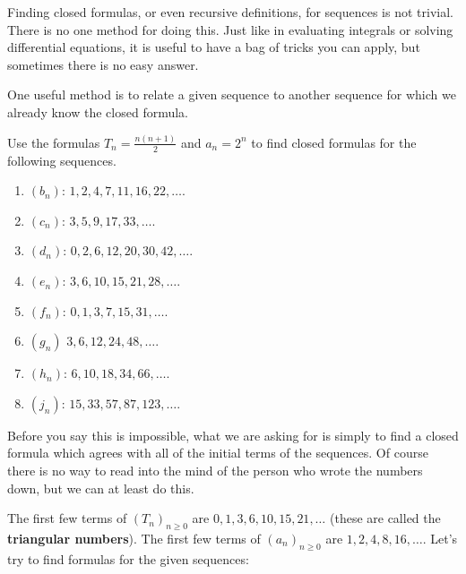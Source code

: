 \documentclass[11pt,]{book}
\newcommand{\terminology}[1]{\textbf{#1}}
\theoremstyle{ptxplainnotitle}
\theoremstyle{ptxplaintitle}
\theoremstyle{ptxdefinitionnotitle}
\theoremstyle{ptxdefinitiontitle}
\theoremstyle{ptxdefinitionnotitle}
\theoremstyle{ptxdefinitiontitle}
\theoremstyle{ptxdefinitionnotitle}
\theoremstyle{ptxdefinitiontitle}
\theoremstyle{ptxdefinitiontitlenonumber}
\theoremstyle{ptxdefinitiontitlenonumber}
\numberwithin{equation}{chapter}
\begin{document}
\hypertarget{p-58}{}%
Finding closed formulas, or even recursive definitions, for sequences is not trivial. There is no one method for doing this. Just like in evaluating integrals or solving differential equations, it is useful to have a bag of tricks you can apply, but sometimes there is no easy answer.%
\par
\hypertarget{p-59}{}%
One useful method is to relate a given sequence to another sequence for which we already know the closed formula.%
\begin{example}\label{example-4}
\hypertarget{p-60}{}%
Use the formulas \(T_n = \frac{n(n+1)}{2}\) and \(a_n = 2^n\) to find closed formulas for the following sequences. \leavevmode%
\begin{enumerate}
\item\hypertarget{li-34}{}\hypertarget{p-61}{}%
\((b_n)\): \(1, 2, 4, 7, 11, 16, 22, \ldots \).%
\item\hypertarget{li-35}{}\hypertarget{p-62}{}%
\((c_n)\): \(3, 5, 9, 17, 33,\ldots \).%
\item\hypertarget{li-36}{}\hypertarget{p-63}{}%
\((d_n)\): \(0, 2, 6, 12, 20, 30, 42,\ldots \).%
\item\hypertarget{li-37}{}\hypertarget{p-64}{}%
\((e_n)\): \(3, 6, 10, 15, 21, 28, \ldots\).%
\item\hypertarget{li-38}{}\hypertarget{p-65}{}%
\((f_n)\): \(0, 1, 3, 7, 15, 31, \ldots \).%
\item\hypertarget{li-39}{}\hypertarget{p-66}{}%
\((g_n)\) \(3, 6, 12, 24, 48, \ldots \).%
\item\hypertarget{li-40}{}\hypertarget{p-67}{}%
\((h_n)\): \(6, 10, 18, 34, 66, \ldots \).%
\item\hypertarget{li-41}{}\hypertarget{p-68}{}%
\((j_n)\): \(15, 33, 57, 87, 123, \ldots\).%
\end{enumerate}
%
\par\smallskip%
\noindent\textbf{}\hypertarget{solution-3}{}\hypertarget{p-69}{}%
Before you say this is impossible, what we are asking for is simply to find a closed formula which agrees with all of the initial terms of the sequences. Of course there is no way to read into the mind of the person who wrote the numbers down, but we can at least do this.%
\par
\hypertarget{p-70}{}%
The first few terms of \((T_n)_{n\ge 0}\)\label{notation-2}
 are \(0, 1, 3, 6, 10, 15, 21, \ldots\) (these are called the \terminology{triangular numbers}). The first few terms of \((a_n)_{n\ge 0}\) are \(1, 2, 4, 8, 16, \ldots\).  Let's try to find formulas for the given sequences: \leavevmode%

\end{example}
\end{document}
